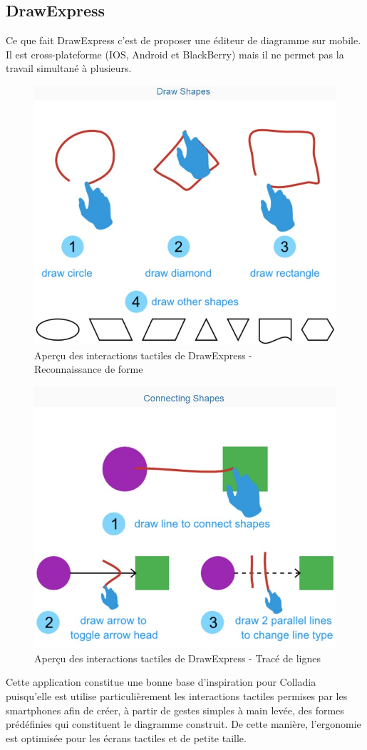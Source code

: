 \documentclass[a4paper,11pt]{article}
\begin{document}
\subsection{DrawExpress}
Ce que fait DrawExpress c’est de proposer une éditeur de diagramme sur mobile. Il est cross-plateforme (IOS, Android et BlackBerry) mais il ne permet pas la travail simultané à plusieurs.

\begin{figure}[!h]
	\centering
	\includegraphics[width=.6\textwidth]{img/DrawExpressRecognition}
	\caption{Aperçu des interactions tactiles de DrawExpress - \\Reconnaissance de forme}
\end{figure}

\begin{figure}[!h]
	\centering
	\includegraphics[width=.6\textwidth]{img/DrawExpressLinks}
	\caption{Aperçu des interactions tactiles de DrawExpress - Tracé de lignes}
\end{figure}

Cette application constitue une bonne base d’inspiration pour Colladia puisqu’elle est utilise particulièrement les interactions tactiles permises par les smartphones afin de créer, à partir de gestes simples à main levée, des formes prédéfinies qui constituent le diagramme construit. De cette manière, l’ergonomie est optimisée pour les écrans tactiles et de petite taille.
\end{document}
